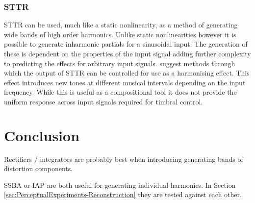 		\subsubsection*{STTR}
			STTR can be used, much like a static nonlinearity, as a method of generating wide bands of high
			order harmonics. Unlike static nonlinearities however it is possible to generate inharmonic
			partials for a sinusoidal input. The generation of these is dependent on the properties of the
			input signal adding further complexity to predicting the effects for arbitrary input signals.
			\citet{kim2015harmonizing} suggest methods through which the output of STTR can be controlled for
			use as a harmonising effect. This effect introduces new tones at different musical intervals
			depending on the input frequency. While this is useful as a compositional tool it does not provide
			the uniform response across input signals required for timbral control.

\section{Conclusion}
	\note
	{
		Rectifiers / integrators are probably best when introducing generating bands of distortion components.
		
		SSBA or IAP are both useful for generating individual harmonics. In Section
		\ref{sec:PerceptualExperiments-Reconstruction} they are tested against each other.
	}
